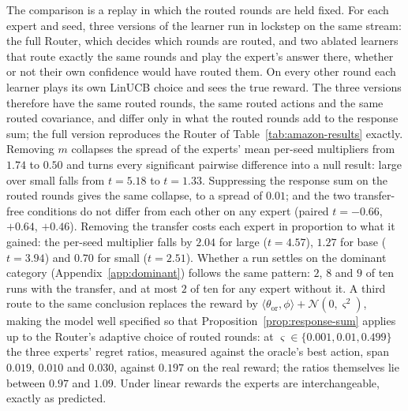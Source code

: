 \documentclass{article}
\theoremstyle{definition}
\theoremstyle{remark}
\theoremstyle{remark}
\begin{document}
The comparison is a replay in which the routed rounds are held fixed. For
each expert and seed, three versions of the learner run in lockstep on the
same stream: the full Router, which decides which rounds are routed, and two
ablated learners that route exactly the same rounds and play the expert's
answer there, whether or not their own confidence would have routed them. On
every other round each learner plays its own LinUCB choice and sees the true
reward. The three versions therefore have the same routed rounds, the same
routed actions and the same routed covariance, and differ only in what the
routed rounds add to the response sum; the full version reproduces the
Router of Table~\ref{tab:amazon-results} exactly. Removing $m$ collapses the
spread of the experts' mean per-seed multipliers from $1.74$ to $0.50$ and
turns every significant pairwise difference into a null result: large over
small falls from $t=5.18$ to $t=1.33$. Suppressing the response sum on the
routed rounds gives the same collapse, to a spread of $0.01$; and the two
transfer-free conditions do not differ from each other on any expert (paired
$t=-0.66$, $+0.64$, $+0.46$). Removing the transfer costs each expert in
proportion to what it gained: the per-seed multiplier falls by $2.04$ for
large ($t=4.57$), $1.27$ for base ($t=3.94$) and $0.70$ for small
($t=2.51$). Whether a run settles on the dominant category
(Appendix~\ref{app:dominant}) follows the same pattern: $2$, $8$ and $9$ of
ten runs with the transfer, and at most $2$ of ten for any expert without
it. A third route to the same conclusion
replaces the reward by $\langle\theta_{\mathrm{or}},\phi\rangle+\mathcal
N(0,\varsigma^2)$, making the model well specified so that
Proposition~\ref{prop:response-sum} applies up to the Router's adaptive
choice of routed rounds: at
$\varsigma\in\{0.001,0.01,0.499\}$ the three experts' regret ratios, measured
against the oracle's best action, span $0.019$, $0.010$ and $0.030$, against
$0.197$ on the real reward; the ratios themselves lie between $0.97$ and
$1.09$. Under linear rewards the experts are interchangeable, exactly as
predicted.
\end{document}
